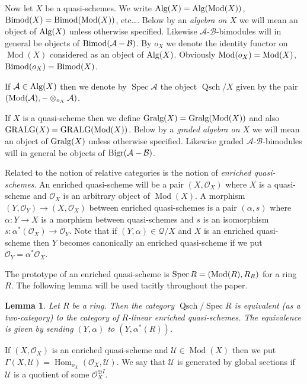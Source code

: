 \documentclass{amsproc}
\def\Ascr{{\mathcal A}}
\def\Bscr{{\mathcal B}}
\def\Oscr{{\mathcal O}}
\def\Qscr{{\mathcal Q}}
\def\Uscr{{\mathcal U}}
\def\Mod{\mathop{\text{Mod}}}
\def\Bimod{\mathop{\text{Bimod}}}
\def\Bigr{\mathop{\text{Bigr}}}
\def\Alg{\mathop{\text{Alg}}}
\def\Gralg{\mathop{\text{Gralg}}}
\def\GRALG{\mathop{\text{GRALG}}}
\def\Spec{\operatorname {Spec}}
\def\Hom{\operatorname {Hom}}
\def\Qsch{\operatorname {Qsch}}
\def\Qch{\operatorname {Mod}}
\def\r{\rightarrow}
\let\oldtext\text
\def\text#1{\oldtext{\upshape #1}}
\newtheorem{lemmas}{Lemma}[subsection]
\theoremstyle{definition}
\theoremstyle{remark}
\numberwithin{equation}{section}
\numberwithin{table}{section}
\numberwithin{figure}{section}
\begin{document}
Now let $X$ be a quasi-schemes.  We write
$\Alg(X)=\Alg(\Qch(X))$, $\Bimod(X)=\Bimod(\Qch(X))$, etc\dots. Below by an
\emph{algebra on $X$} we will mean an object of $\Alg(X)$ unless
otherwise specified. Likewise $\Ascr$-$\Bscr$-bimodules will in
general be objects of $\Bimod(\Ascr-\Bscr)$. By $o_X$ we denote the
identity functor on $\Qch(X)$ considered as an object of $\Alg(X)$.
Obviously $\Mod(o_X)=\Qch(X)$, $\Bimod(o_X)=\Bimod(X)$.





If $\Ascr\in\Alg(X)$ then we denote by $\Spec\Ascr$ the object
$\Qsch/X$ given by the pair $(\Mod(\Ascr),-\otimes_{o_X}\Ascr)$.






If $X$ is a quasi-scheme then we define
$\Gralg(X)=\Gralg(\Qch(X))$ and also $\GRALG(X)=\GRALG(\Qch(X))$. 
 Below by a \emph{graded algebra on $X$} we will mean an object
of $\Gralg(X)$ unless otherwise specified. Likewise graded
$\Ascr$-$\Bscr$-bimodules will in general be objects of $\Bigr(\Ascr-\Bscr)$.


Related to the notion of relative categories is the notion of
\emph{enriched quasi-schemes}.  An enriched quasi-scheme will be a
pair $(X,\Oscr_X)$ where $X$ is a quasi-scheme and $\Oscr_X$ is an
arbitrary object of $\Qch(X)$. A morphism $(Y,\Oscr_Y)\r (X,\Oscr_X)$
between enriched quasi-schemes is a pair $(\alpha,s)$ where
$\alpha:Y\r X$ is a morphism between quasi-schemes and $s$ is an
isomorphism $s:\alpha^\ast(\Oscr_X)\r \Oscr_Y$. Note that if
$(Y,\alpha)\in \Qscr/X$ and $X$ is an enriched quasi-scheme then $Y$
becomes canonically an enriched quasi-scheme if we put
$\Oscr_Y=\alpha^\ast\Oscr_X$.

The prototype of an
enriched quasi-scheme is $\Spec R=(\Mod(R),R_R)$ for a ring $R$. The
following lemma will be used tacitly throughout the paper.
\begin{lemmas} Let $R$ be a ring. Then the category $\Qsch/\Spec R$ is
  equivalent (as a two-category) to the category of $R$-linear
  enriched quasi-schemes.  The equivalence is given by sending
  $(Y,\alpha)$ to $(Y,\alpha^\ast(R))$.
\end{lemmas}


If $(X,\Oscr_X)$ is an enriched quasi-scheme and $\Uscr\in \Qch(X)$
then we put $\Gamma(X,\Uscr)=\Hom_{o_X}(\Oscr_X,\Uscr)$. We say that
$\Uscr$ is generated by global sections if $\Uscr$ is a quotient of
some $\Oscr_X^{\oplus I}$.
\end{document}

